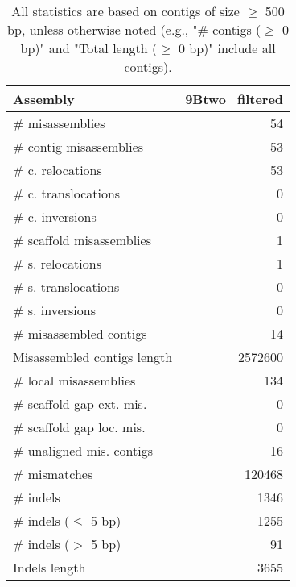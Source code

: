 \documentclass[12pt,a4paper]{article}
\begin{document}
\begin{table}[ht]
\begin{center}
\caption{All statistics are based on contigs of size $\geq$ 500 bp, unless otherwise noted (e.g., "\# contigs ($\geq$ 0 bp)" and "Total length ($\geq$ 0 bp)" include all contigs).}
\begin{tabular}{|l*{1}{|r}|}
\hline
Assembly & 9Btwo\_filtered \\ \hline
\# misassemblies & 54 \\ \hline
\hspace{2mm}\# contig misassemblies & 53 \\ \hline
\hspace{5mm}\# c. relocations & 53 \\ \hline
\hspace{5mm}\# c. translocations & 0 \\ \hline
\hspace{5mm}\# c. inversions & 0 \\ \hline
\hspace{2mm}\# scaffold misassemblies & 1 \\ \hline
\hspace{5mm}\# s. relocations & 1 \\ \hline
\hspace{5mm}\# s. translocations & 0 \\ \hline
\hspace{5mm}\# s. inversions & 0 \\ \hline
\# misassembled contigs & 14 \\ \hline
Misassembled contigs length & 2572600 \\ \hline
\# local misassemblies & 134 \\ \hline
\# scaffold gap ext. mis. & 0 \\ \hline
\# scaffold gap loc. mis. & 0 \\ \hline
\# unaligned mis. contigs & 16 \\ \hline
\# mismatches & 120468 \\ \hline
\# indels & 1346 \\ \hline
\hspace{5mm}\# indels ($\leq$ 5 bp) & 1255 \\ \hline
\hspace{5mm}\# indels ($>$ 5 bp) & 91 \\ \hline
Indels length & 3655 \\ \hline
\end{tabular}
\end{center}
\end{table}
\end{document}
